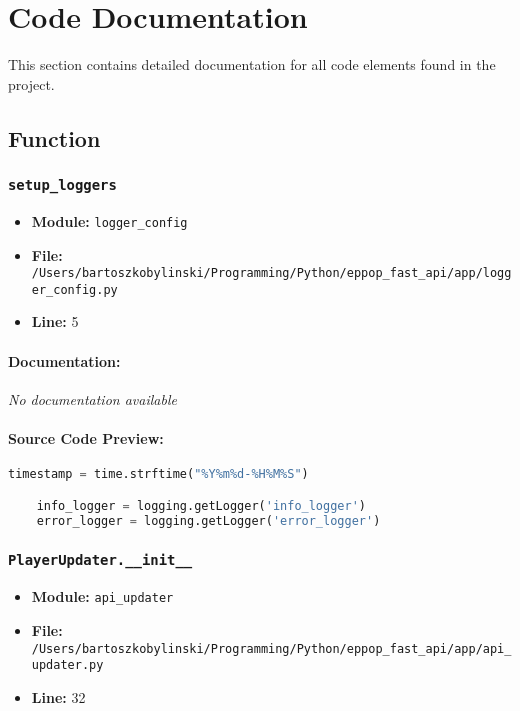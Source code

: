 \documentclass[11pt,a4paper]{article}
\begin{document}
\section{Code Documentation}

This section contains detailed documentation for all code elements found in the project.

\subsection{Function}

\subsubsection{\texttt{setup\_loggers}}

\begin{itemize}
    \item \textbf{Module:} \texttt{logger\_config}
    \item \textbf{File:} \texttt{/Users/bartoszkobylinski/Programming/Python/eppop\_fast\_api/app/logger\_config.py}
    \item \textbf{Line:} 5
\end{itemize}

\paragraph{Documentation:} \textit{No documentation available}

\paragraph{Source Code Preview:}
\begin{lstlisting}[language=Python]
    timestamp = time.strftime("%Y%m%d-%H%M%S")

    info_logger = logging.getLogger('info_logger')
    error_logger = logging.getLogger('error_logger')

\end{lstlisting}

\vspace{1em}
\subsubsection{\texttt{PlayerUpdater.\_\_init\_\_}}

\begin{itemize}
    \item \textbf{Module:} \texttt{api\_updater}
    \item \textbf{File:} \texttt{/Users/bartoszkobylinski/Programming/Python/eppop\_fast\_api/app/api\_updater.py}
    \item \textbf{Line:} 32
\end{itemize}
\end{document}
